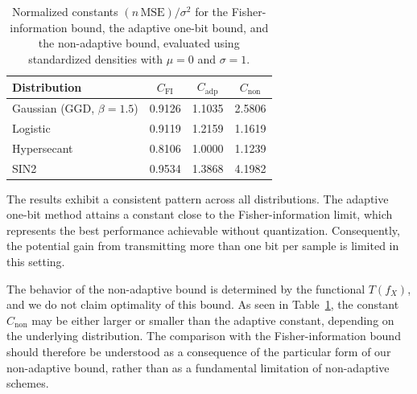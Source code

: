 \documentclass[10pt]{article} %
\theoremstyle{plain}
\theoremstyle{definition}
\theoremstyle{remark}
\begin{document}
\begin{table}[tb!]
\centering
\begin{tabular}{|l|c|c|c|}
\hline
Distribution & $C_{\mathrm{FI}}$ & $C_{\mathrm{adp}}$ & $C_{\mathrm{non}}$ \\
\hline
Gaussian (GGD, $\beta=1.5$) & 0.9126 & 1.1035 & 2.5806 \\
\hline
Logistic                    & 0.9119 & 1.2159 & 1.1619 \\
\hline
Hypersecant                 & 0.8106 & 1.0000 & 1.1239 \\
\hline
SIN2                        & 0.9534 & 1.3868 & 4.1982 \\
\hline
\end{tabular}
\caption{Normalized constants $(n\,\mathrm{MSE})/\sigma^{2}$ for the Fisher-information
bound, the adaptive one-bit bound, and the non-adaptive bound, evaluated using
standardized densities with $\mu=0$ and $\sigma=1$.}
\label{tab:constants}
\end{table}




The results exhibit a consistent pattern across all distributions.  
The adaptive one-bit method attains a constant close to the Fisher-information limit,
which represents the best performance achievable without quantization.  
Consequently, the potential gain from transmitting more than one bit per sample is
limited in this setting.

The behavior of the non-adaptive bound is determined by the functional $T(f_X)$, and we do
not claim optimality of this bound. As seen in Table~\ref{tab:constants}, the constant
\emph{$C_{\mathrm{non}}$} may be either larger or smaller than the adaptive constant, depending on
the underlying distribution. The comparison with the Fisher-information bound should
therefore be understood as a consequence of the particular form of our non-adaptive bound,
rather than as a fundamental limitation of non-adaptive schemes.






\end{document}
